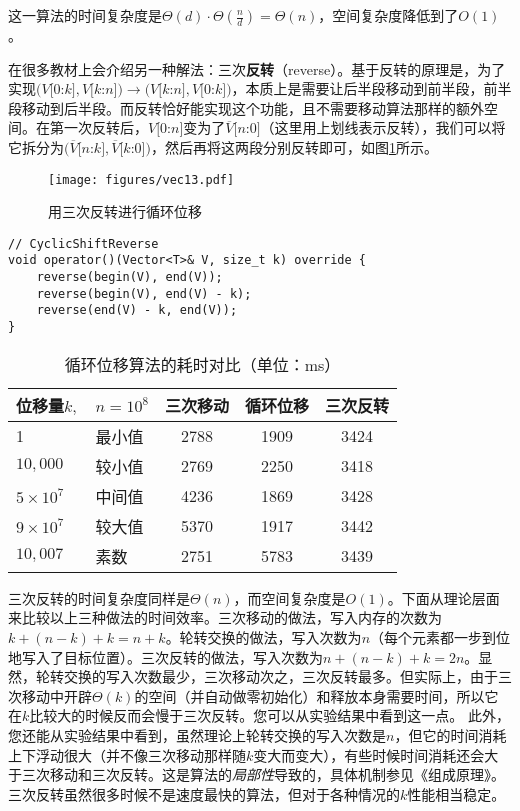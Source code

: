 这一算法的时间复杂度是$\Theta(d)\cdot \Theta\left(\frac nd\right) = \Theta(n)$，空间复杂度降低到了$O(1)$。

在很多教材上会介绍另一种解法：三次\textbf{反转}（reverse）。基于反转的原理是，为了实现$(V[0$:$k],V[k$:$n])\to (V[k$:$n],V[0$:$k])$，本质上是需要让后半段移动到前半段，前半段移动到后半段。而反转恰好能实现这个功能，且不需要移动算法那样的额外空间。在第一次反转后，$V[0$:$n]$变为了$\overline{V}[n$:$0]$（这里用上划线表示反转），我们可以将它拆分为$(\overline{V}[n$:$k],\overline{V}[k$:$0])$，然后再将这两段分别反转即可，如图\ref{fig:vec13}所示。

\begin{figure}
  \centering
  \texttt{[image: figures/vec13.pdf]}
  \caption{用三次反转进行循环位移}
  \label{fig:vec13}
\end{figure}

\begin{lstlisting}
// CyclicShiftReverse
void operator()(Vector<T>& V, size_t k) override {
    reverse(begin(V), end(V));
    reverse(begin(V), end(V) - k);
    reverse(end(V) - k, end(V));
}
\end{lstlisting}

\begin{table}
  \centering
  \caption{循环位移算法的耗时对比（单位：ms）}
  \begin{tabular}{ll|ccc}
    \toprule
      位移量$k,$ & $n = 10^8$ & 三次移动 & 循环位移 & 三次反转  
      \\
    \midrule
    1 & 最小值 & 2788 & 1909 & 3424 \\
    $10,000$ & 较小值 & 2769 & 2250 & 3418 \\
    $5\times 10^7$ & 中间值 & 4236 & 1869 & 3428 \\
    $9\times 10^7$ & 较大值 & 5370 & 1917 & 3442 \\
    \midrule
    $10,007$ & 素数 & 2751 & 5783 & 3439 \\
    \bottomrule
  \end{tabular}
  \label{tab:vec4}
\end{table}

三次反转的时间复杂度同样是$\Theta(n)$，而空间复杂度是$O(1)$。下面从理论层面来比较以上三种做法的时间效率。三次移动的做法，写入内存的次数为$k+(n-k)+k=n+k$。轮转交换的做法，写入次数为$n$（每个元素都一步到位地写入了目标位置）。三次反转的做法，写入次数为$n+(n-k)+k=2n$。显然，轮转交换的写入次数最少，三次移动次之，三次反转最多。但实际上，由于三次移动中开辟$\Theta(k)$的空间（并自动做零初始化）和释放本身需要时间，所以它在$k$比较大的时候反而会慢于三次反转。您可以从实验结果中看到这一点。
此外，您还能从实验结果中看到，虽然理论上轮转交换的写入次数是$n$，但它的时间消耗上下浮动很大（并不像三次移动那样随$k$变大而变大），有些时候时间消耗还会大于三次移动和三次反转。这是算法的\textit{局部性}导致的，具体机制参见《组成原理》。三次反转虽然很多时候不是速度最快的算法，但对于各种情况的$k$性能相当稳定。


